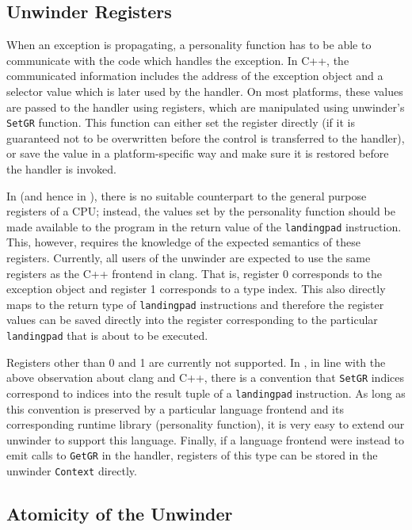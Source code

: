 \subsection{Unwinder Registers}\label{unwinder-registers}

When an exception is propagating, a personality function has to be able
to communicate with the code which handles the exception. In C++, the
communicated information includes the address of the exception object
and a selector value which is later used by the handler. On most
platforms, these values are passed to the handler using registers, which
are manipulated using unwinder's \texttt{SetGR} function. This function
can either set the register directly (if it is guaranteed not to be
overwritten before the control is transferred to the handler), or save
the value in a platform-specific way and make sure it is restored before
the handler is invoked.

In \llvm{} (and hence in \divm{}), there is no suitable counterpart to the
general purpose registers of a CPU; instead, the values set by the
personality function should be made available to the program in the
return value of the \texttt{landingpad} instruction. This, however,
requires the knowledge of the expected semantics of these registers.
Currently, all users of the unwinder are expected to use the same
registers as the C++ frontend in clang. That is, register 0 corresponds
to the exception object and register 1 corresponds to a type index. This
also directly maps to the return type of \texttt{landingpad}
instructions and therefore the register values can be saved directly
into the \llvm{} register corresponding to the particular
\texttt{landingpad} that is about to be executed.

Registers other than 0 and 1 are currently not supported. In \llvm{}, in
line with the above observation about clang and C++, there is a
convention that \texttt{SetGR} indices correspond to indices into the
result tuple of a \texttt{landingpad} instruction. As long as this
convention is preserved by a particular language frontend and its
corresponding runtime library (personality function), it is very easy to
extend our unwinder to support this language. Finally, if a language
frontend were instead to emit calls to \texttt{GetGR} in the handler,
registers of this type can be stored in the unwinder \texttt{Context}
directly.

\subsection{Atomicity of the Unwinder}\label{atomicity-of-the-unwinder}

